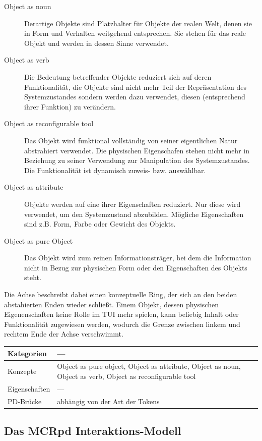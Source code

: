 \begin{description}
	\item[Object as noun] Derartige Objekte sind Platzhalter für Objekte der realen Welt, denen sie in Form und Verhalten weitgehend entsprechen. Sie stehen für das reale Objekt und werden in dessen Sinne verwendet.
	\item[Object as verb] Die Bedeutung betreffender Objekte reduziert sich auf deren Funktionalität, die Objekte sind nicht mehr Teil der Repräsentation des Systemzustandes sondern werden dazu verwendet, diesen (entsprechend ihrer Funktion) zu verändern.
	\item[Object as reconfigurable tool] Das Objekt wird funktional vollständig von seiner eigentlichen Natur abstrahiert verwendet. Die physischen Eigenschafen stehen nicht mehr in Beziehung zu seiner Verwendung zur Manipulation des Systemzustandes. Die Funktionalität ist dynamisch zuweis- bzw. auswählbar.
	\item[Object as attribute] Objekte werden auf eine ihrer Eigenschaften reduziert. Nur diese wird verwendet, um den Systemzustand abzubilden. Mögliche Eigenschaften sind z.B. Form, Farbe oder Gewicht des Objekts.
	\item[Object as pure Object] Das Objekt wird zum reinen Informationsträger, bei dem die Information nicht in Bezug zur physischen Form oder den Eigenschaften des Objekts steht.
\end{description}

Die Achse beschreibt dabei einen konzeptuelle Ring, der sich an den beiden abstahierten Enden wieder schließt. Einem Objekt, dessen physischen Eigenenschaften keine Rolle im \gls{TUI} mehr spielen, kann beliebig Inhalt oder Funktionalität zugewiesen werden, wodurch die Grenze zwischen linkem und rechtem Ende der Achse verschwimmt.

\begin{tabular}{| p{3cm} | p{10cm} |}
  \hline
  Kategorien & --- \\ \hline
  Konzepte & Object as pure object, Object as attribute, Object as noun, Object as verb, Object as reconfigurable tool  \\ \hline
  Eigenschaften & --- \\ \hline
  PD-Brücke & abhängig von der Art der Tokens  \\ \hline
\end{tabular} 

\subsection{Das MCRpd Interaktions-Modell} %
\label{sub:mcrpd}

